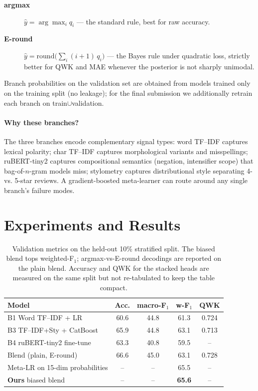 \documentclass[11pt]{article}
\begin{document}
\begin{description}
  \item[\textbf{argmax}] $\hat{y} = \arg\max_i q_i$ --- the standard rule, best for raw accuracy.
  \item[\textbf{E-round}] $\hat{y} = \mathrm{round}\!\big(\sum_{i} (i{+}1)\,q_i\big)$ ---
    the Bayes rule under quadratic loss, strictly better for QWK and MAE
    whenever the posterior is not sharply unimodal.
\end{description}

Branch probabilities on the validation set are obtained from models trained
only on the training split (no leakage); for the final submission we additionally
retrain each branch on train$\cup$validation.

\paragraph{Why these branches?} The three branches encode complementary
signal types: word TF--IDF captures lexical polarity; char TF--IDF captures
morphological variants and misspellings; ruBERT-tiny2 captures compositional
semantics (negation, intensifier scope) that bag-of-$n$-gram models miss;
stylometry captures distributional style separating 4- vs. 5-star reviews.
A gradient-boosted meta-learner can route around any single branch's failure
modes.

\section{Experiments and Results}
\label{sec:results}

\begin{table}[t]
  \centering
  \small
  \begin{tabular}{lcccc}
    \toprule
    Model & Acc. & macro-F$_1$ & w-F$_1$ & QWK \\
    \midrule
    B1 Word TF--IDF + LR               & 60.6 & 44.8 & 61.3 & 0.724 \\
    B3 TF--IDF+Sty + CatBoost          & 65.9 & 44.8 & 63.1 & 0.713 \\
    B4 ruBERT-tiny2 fine-tune          & 63.3 & 40.8 & 59.5 &  --   \\
    \midrule
    Blend (plain, E-round)             & 66.6 & 45.0 & 63.1 & 0.728 \\
    Meta-LR on 15-dim probabilities    &  --  &  --  & 65.5 &  --   \\
    \textbf{Ours} biased blend         &  --  &  --  & \textbf{65.6} &  --   \\
    \bottomrule
  \end{tabular}
  \caption{Validation metrics on the held-out 10\% stratified split. The
  biased blend tops weighted-F$_1$; argmax-vs-E-round decodings are reported
  on the plain blend. Accuracy and QWK for the stacked heads are measured on
  the same split but not re-tabulated to keep the table compact.}
  \label{tab:main}
\end{table}
\end{document}
